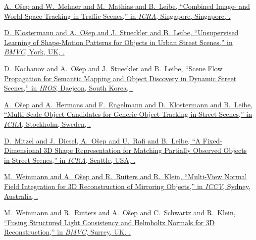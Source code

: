 \documentclass[letterpaper,MMMyyyy,nonstopmode]{simpleresumecv}
\begin{document}
\begin{Body}
\Gap
\href{https://www.vision.rwth-aachen.de/media/papers/paper_final_compressed.pdf}
{\underline{A.~Ošep} and W.~Mehner and M.~Mathias and B.~Leibe,
``Combined Image- and World-Space Tracking in Traffic Scenes,''
in \textit{ICRA},
Singapore, Singapore,
.}

\Gap
\href{https://www.vision.rwth-aachen.de/media/papers/bmvc16_klostermann_final.pdf}
{D.~Klostermann and \underline{A.~Ošep} and J.~Stueckler and B.~Leibe,
``Unsupervised Learning of Shape-Motion Patterns for Objects in Urban Street Scenes,''
in \textit{BMVC},
York, UK,
.}

\Gap
\href{https://www.vision.rwth-aachen.de/media/papers/paper_compressed.pdf}
{D.~Kochanov and \underline{A.~Ošep} and J.~Stueckler and B.~Leibe,
``Scene Flow Propagation for Semantic Mapping and Object Discovery in Dynamic Street Scenes,''
in \textit{IROS},
Daejeon, South Korea,
.}

\Gap
\href{https://www.vision.rwth-aachen.de/media/papers/osep_ICRA16_paper.pdf}
{\underline{A.~Ošep} and A.~Hermans and F.~Engelmann and D.~Klostermann and B.~Leibe,
``Multi-Scale Object Candidates for Generic Object Tracking in Street Scenes,''
in \textit{ICRA}, Stockholm, Sweden,
.}

\Gap
\href{https://www.vision.rwth-aachen.de/media/papers/mitzel15icra_3d_shape_representation.pdf}
{D.~Mitzel and J.~Diesel, \underline{A.~Ošep} and U.~Rafi and B.~Leibe,
``A Fixed-Dimensional 3D Shape Representation for Matching Partially Observed Objects in Street Scenes,''
in \textit{ICRA},
Seattle, USA,
.}

\Gap
\href{https://www.vision.rwth-aachen.de/media/papers/weinmann_reconstruction_of_mirroring_objects_iccv2013.pdf}
{M.~Weinmann and \underline{A.~Ošep} and R.~Ruiters and R.~Klein,
``Multi-View Normal Field Integration for 3D Reconstruction of Mirroring Objects,''
in \textit{ICCV},
Sydney, Australia,
.}

\Gap
\href{https://www.vision.rwth-aachen.de/media/papers/weinmann-2012-3DReconstruction.pdf}
{M.~Weinmann and R.~Ruiters and \underline{A.~Ošep} and C.~Schwartz and R.~Klein,
``Fusing Structured Light Consistency and Helmholtz Normals for 3D Reconstruction,''
in \textit{BMVC},
Surrey, UK,
.}


\end{Body}
\end{document}
